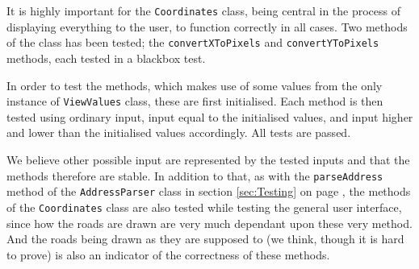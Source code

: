 It is highly important for the \texttt{Coordinates} class, being central in the process of displaying everything to the user, to function correctly in all cases. Two methods of the class has been tested; the \texttt{convertXToPixels} and \texttt{convertYToPixels} methods, each tested in a blackbox test.

In order to test the methods, which makes use of some values from the only instance of \texttt{ViewValues} class, these are first initialised. Each method is then tested  using ordinary input, input equal to the initialised values, and input higher and lower than the initialised values accordingly. All tests are passed.

We believe other possible input are represented by the tested inputs and that the methods therefore are stable. In addition to that, as with the \texttt{parseAddress} method of the \texttt{AddressParser} class in section \ref{sec:Testing} on page \pageref{sec:Testing}, the methods of the \texttt{Coordinates} class are also tested while testing the general user interface, since how the roads are drawn are very much dependant upon these very method. And the roads being drawn as they are supposed to (we think, though it is hard to prove) is also an indicator of the correctness of these methods.